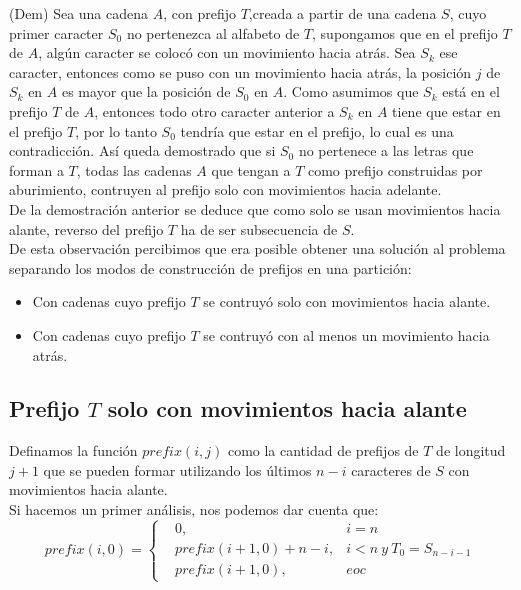 \documentclass[a4paper]{article}
\begin{document}
    (Dem) Sea una cadena $A$, con prefijo $T$,creada a partir de una cadena $S$, cuyo primer caracter $S_0$ no pertenezca al alfabeto de $T$, 
    supongamos que en el prefijo $T$ de $A$, alg\'un caracter se coloc\'o con un movimiento hacia atr\'as. Sea 
    $S_k$ ese caracter, entonces como se puso con un movimiento hacia atr\'as, la posici\'on $j$ de $S_k$ en $A$
    es mayor que la posici\'on de $S_0$ en $A$. Como asumimos que $S_k$ est\'a en el prefijo $T$ de $A$, entonces todo otro caracter anterior 
    a $S_k$ en $A$ tiene que estar en el prefijo $T$, por lo tanto $S_0$ tendr\'ia que estar en el prefijo, lo cual es una contradicci\'on. As\'i queda demostrado que 
    si $S_0$ no pertenece a las letras que forman a $T$, todas las cadenas $A$ que tengan a $T$ como prefijo construidas por aburimiento, 
    contruyen al prefijo solo con movimientos hacia adelante.\\

    De la demostraci\'on anterior se deduce que como solo se usan movimientos hacia alante, reverso del prefijo $T$ ha de ser subsecuencia de $S$.\\

    De esta observaci\'on percibimos que era posible obtener una soluci\'on al problema separando los modos de construcci\'on de prefijos 
    en una partici\'on: 

    \begin{itemize}
        \item Con cadenas cuyo prefijo $T$ se contruy\'o solo con movimientos hacia alante.
        \item Con cadenas cuyo prefijo $T$ se contruy\'o con al menos un movimiento hacia atr\'as.
    \end{itemize}

    \subsection*{Prefijo $T$ solo con movimientos hacia alante}

    Definamos la funci\'on $prefix(i,j)$ como la cantidad de prefijos de $T$ de longitud $j + 1$ que se pueden formar utilizando los \'ultimos $n - i$ caracteres de $S$ con movimientos hacia alante.\\ 

    Si hacemos un primer an\'alisis, nos podemos dar cuenta que:
    $$prefix(i,0) = \left\{ \begin{aligned}
        &0,& i = n \\
        & prefix(i+1,0) + n -i,& i < n~ y~ T_0=S_{n-i-1} \\
        &prefix(i+1,0), & eoc
    \end{aligned}\right.$$
\end{document}
